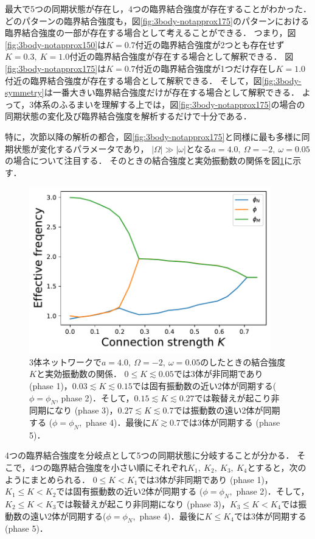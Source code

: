 \documentclass[../main]{subfiles}
\begin{document}
最大で5つの同期状態が存在し，4つの臨界結合強度が存在することがわかった．
どのパターンの臨界結合強度も，図\ref{fig:3body-notapprox175}のパターンにおける臨界結合強度の一部が存在する場合として考えることができる．
つまり，図\ref{fig:3body-notapprox150}は$K=0.7$付近の臨界結合強度が2つとも存在せず$K=0.3,\ K=1.0$付近の臨界結合強度が存在する場合として解釈できる．
図\ref{fig:3body-notapprox175}は$K=0.7$付近の臨界結合強度が1つだけ存在し$K=1.0$付近の臨界結合強度が存在する場合として解釈できる．
そして，図\ref{fig:3body-symmetry}は一番大きい臨界結合強度だけが存在する場合として解釈できる．
よって，3体系のふるまいを理解する上では，図\ref{fig:3body-notapprox175}の場合の同期状態の変化及び臨界結合強度を解析するだけで十分である．

特に，次節以降の解析の都合，図\ref{fig:3body-notapprox175}と同様に最も多様に同期状態が変化するパラメータであり，
$|\Omega|\gg|\omega|$となる$a=4.0,\ \Omega=-2,\ \omega=0.05$の場合について注目する．
そのときの結合強度と実効振動数の関係を図\ref{fig:3body-state}に示す．
\begin{figure}[tbp]
\centering
\includegraphics[width=105mm]{./images/three-body-prob.pdf}
\centering
\caption{3体ネットワークで$a=4.0,\ \Omega=-2,\ \omega=0.05$のしたときの結合強度$K$と実効振動数の関係．
$0\leq K\lesssim 0.05$では3体が非同期であり (phase 1)，$0.03\lesssim K\lesssim 0.15$では固有振動数の近い2体が同期する($\phi=\phi_N$, phase 2)．そして，$0.15 \lesssim K\lesssim 0.27$では鞍替えが起こり非同期になり (phase 3)，$0.27\lesssim K\lesssim 0.7$では振動数の遠い2体が同期する ($\phi=\phi_N$,\ phase 4)．最後に$K\gtrsim 0.7$では3体が同期する (phase 5)．}
\label{fig:3body-state}
\end{figure}
4つの臨界結合強度を分岐点として5つの同期状態に分岐することが分かる．
そこで，4つの臨界結合強度を小さい順にそれぞれ$K_1,\ K_2,\ K_3,\ K_4$とすると，次のようにまとめられる．
$0\leq K<K_1$では3体が非同期であり (phase 1)，$K_1\leq K<K_2$では固有振動数の近い2体が同期する ($\phi=\phi_N$,\ phase 2)．そして，$K_2\leq K<K_3$では鞍替えが起こり非同期になり (phase 3)，$K_3\leq K<K_4$では振動数の遠い2体が同期する($\phi=\phi_N$,\ phase 4)．最後に$K\leq K_4$では3体が同期する (phase 5)．
\end{document}
